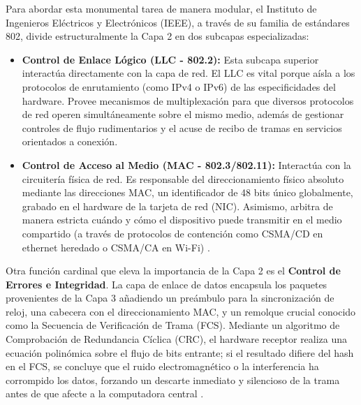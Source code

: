 \documentclass[a4paper,12pt]{article}
\begin{document}
Para abordar esta monumental tarea de manera modular, el Instituto de Ingenieros Eléctricos y Electrónicos (IEEE), a través de su familia de estándares 802, divide estructuralmente la Capa 2 en dos subcapas especializadas:

\begin{itemize}
    \item \textbf{Control de Enlace Lógico (LLC - 802.2):} Esta subcapa superior interactúa directamente con la capa de red. El LLC es vital porque aísla a los protocolos de enrutamiento (como IPv4 o IPv6) de las especificidades del hardware. Provee mecanismos de multiplexación para que diversos protocolos de red operen simultáneamente sobre el mismo medio, además de gestionar controles de flujo rudimentarios y el acuse de recibo de tramas en servicios orientados a conexión.
    \item \textbf{Control de Acceso al Medio (MAC - 802.3/802.11):} Interactúa con la circuitería física de red. Es responsable del direccionamiento físico absoluto mediante las direcciones MAC, un identificador de 48 bits único globalmente, grabado en el hardware de la tarjeta de red (NIC). Asimismo, arbitra de manera estricta cuándo y cómo el dispositivo puede transmitir en el medio compartido (a través de protocolos de contención como CSMA/CD en ethernet heredado o CSMA/CA en Wi-Fi) \cite{kurose2017}.
\end{itemize}

Otra función cardinal que eleva la importancia de la Capa 2 es el \textbf{Control de Errores e Integridad}. La capa de enlace de datos encapsula los paquetes provenientes de la Capa 3 añadiendo un preámbulo para la sincronización de reloj, una cabecera con el direccionamiento MAC, y un remolque crucial conocido como la Secuencia de Verificación de Trama (FCS). Mediante un algoritmo de Comprobación de Redundancia Cíclica (CRC), el hardware receptor realiza una ecuación polinómica sobre el flujo de bits entrante; si el resultado difiere del hash en el FCS, se concluye que el ruido electromagnético o la interferencia ha corrompido los datos, forzando un descarte inmediato y silencioso de la trama antes de que afecte a la computadora central \cite{stallings2014}.
\end{document}
